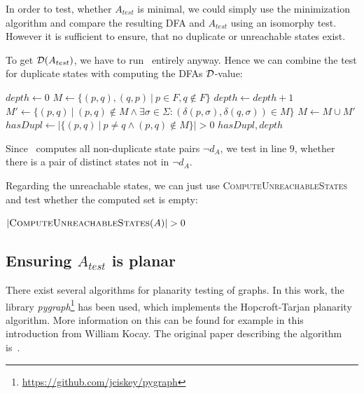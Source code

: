In order to test, whether $A_{test}$ is minimal, we could simply use the minimization algorithm and compare the resulting DFA and $A_{test}$ using an isomorphy test. However it is sufficient to ensure, that no duplicate or unreachable states exist.

To get $\mathcal{D}(A_{test})$, we have to run \MinMark\ entirely anyway. Hence we can combine the test for duplicate states with computing the DFAs $\mathcal{D}$-value:
\vspace{0.2cm}
\begin{algorithmic}[1]
		\State $depth \gets 0$
		\State $M \gets \{ (p,q), (q,p)\ |\ p \in F, q \notin F \}$
		\Do
			\State $depth \gets depth + 1$
			\State $M' \gets \{ (p,q)\ |\ (p,q) \notin M \land \exists \sigma \in \Sigma \colon (\delta(p,\sigma), \delta(q,\sigma)) \in M \}$
			\State $M \gets M \cup M'$
		\State $hasDupl \gets | \{ (p,q)\ |\ p \neq q \land (p,q) \notin M \} | > 0$
		\State \Return $hasDupl, depth$
	\EndFunction
\end{algorithmic}
\vspace{0.2cm}
Since \MinMark\ computes all non-duplicate state pairs $\neg d_A$, we test in line $9$, whether there is a pair of distinct states not in $\neg d_A$.

Regarding the unreachable states, we can just use \textsc{ComputeUnreachableStates} and test whether the computed set is empty:
\vspace{0.2cm}
\begin{algorithmic}[1]
	\State \Return $|\textsc{ComputeUnreachableStates}(A)| > 0$
	\EndFunction
\end{algorithmic}

\subsection{Ensuring $A_{test}$ is planar}

There exist several algorithms for planarity testing of graphs. In this work, the library \emph{pygraph}\footnote{\url{https://github.com/jciskey/pygraph}} has been used, which implements the Hopcroft-Tarjan planarity algorithm. More information on this can be found for example in this~\cite{kocay93} introduction from William Kocay. The original paper describing the algorithm is~\cite{hopcroft74}.

